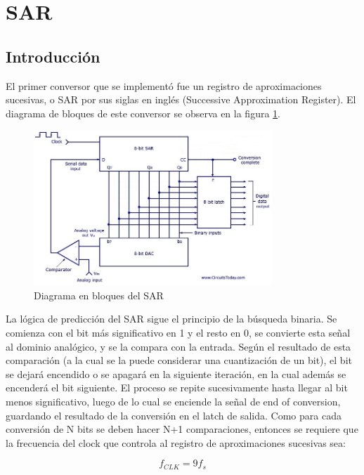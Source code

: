 \documentclass[assd_tp3_main.tex]{subfiles}
\begin{document}
\section{SAR}

\subsection{Introducci\'on}

El primer conversor que se implement\'o fue un registro de aproximaciones sucesivas, o SAR por sus siglas en ingl\'es (Successive Approximation Register). El diagrama de bloques de este conversor se observa en la figura \ref{fig:sar-bloques}.


\begin{figure}[ht!]
	\centering
	\includegraphics[width=0.8\textwidth]{images/ej2/sar-bloques.jpg}
	\caption{Diagrama en bloques del SAR}
	\label{fig:sar-bloques}
\end{figure}

La l\'ogica de predicci\'on del SAR sigue el principio de la b\'usqueda binaria. Se comienza con el bit m\'as significativo en 1 y el resto en 0, se convierte esta se\~nal al dominio anal\'ogico, y se la compara con la entrada. Seg\'un el resultado de esta comparaci\'on (a la cual se la puede considerar una cuantizaci\'on de un bit), el bit se dejar\'a encendido o se apagar\'a en la siguiente iteraci\'on, en la cual adem\'as se encender\'a el bit siguiente. El proceso se repite sucesivamente hasta llegar al bit menos significativo, luego de lo cual se enciende la se\~nal de end of conversion, guardando el resultado de la conversi\'on en el latch de salida. Como para cada conversi\'on de N bits se deben hacer N+1 comparaciones, entonces se requiere que la frecuencia del clock que controla al registro de aproximaciones sucesivas sea:

\begin{equation}
	f_{CLK} = 9f_s
\end{equation} 
\end{document}

